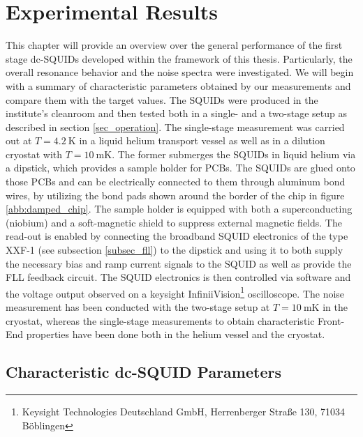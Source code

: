 \chapter{Experimental Results} \label{ch_results}

This chapter will provide an overview over the general performance of the first stage dc-SQUIDs developed within the framework of this thesis. Particularly, the overall resonance behavior and the noise spectra were investigated. We will begin with a summary of characteristic parameters obtained by our measurements and compare them with the target values. The SQUIDs were produced in the institute's cleanroom and then tested both in a single- and a two-stage setup as described in section \ref{sec_operation}. The single-stage measurement was carried out at $T=\qty{4.2}{\kelvin}$ in a liquid helium transport vessel as well as in a dilution cryostat with $T=\qty{10}{\milli\kelvin}$. The former submerges the SQUIDs in liquid helium via a dipstick, which provides a sample holder for PCBs. The SQUIDs are glued onto those PCBs and can be electrically connected to them through aluminum bond wires, by utilizing the bond pads shown around the border of the chip in figure \ref{abb:damped_chip}. The sample holder is equipped with both a superconducting (niobium) and a soft-magnetic shield to suppress external magnetic fields. The read-out is enabled by connecting the broadband SQUID electronics of the type XXF-1 (see subsection \ref{subsec_fll}) to the dipstick and using it to both supply the necessary bias and ramp current signals to the SQUID as well as provide the FLL feedback circuit. The SQUID electronics is then controlled via software and the voltage output observed on a keysight InfiniiVision\footnote{Keysight Technologies Deutschland GmbH, Herrenberger Straße 130, 71034 Böblingen} oscilloscope. The noise measurement has been conducted with the two-stage setup at $T=\qty{10}{\milli\kelvin}$ in the cryostat, whereas the single-stage measurements to obtain characteristic Front-End properties have been done both in the helium vessel and the cryostat. 

\section{Characteristic dc-SQUID Parameters} \label{sec_charac}

